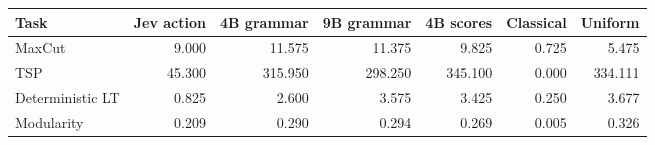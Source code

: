 \begin{tabular}{lrrrrrr}
\toprule
Task & Jev action & 4B grammar & 9B grammar & 4B scores & Classical & Uniform \\
\midrule
MaxCut & 9.000 & 11.575 & 11.375 & 9.825 & 0.725 & 5.475 \\
TSP & 45.300 & 315.950 & 298.250 & 345.100 & 0.000 & 334.111 \\
Deterministic LT & 0.825 & 2.600 & 3.575 & 3.425 & 0.250 & 3.677 \\
Modularity & 0.209 & 0.290 & 0.294 & 0.269 & 0.005 & 0.326 \\
\bottomrule
\end{tabular}
